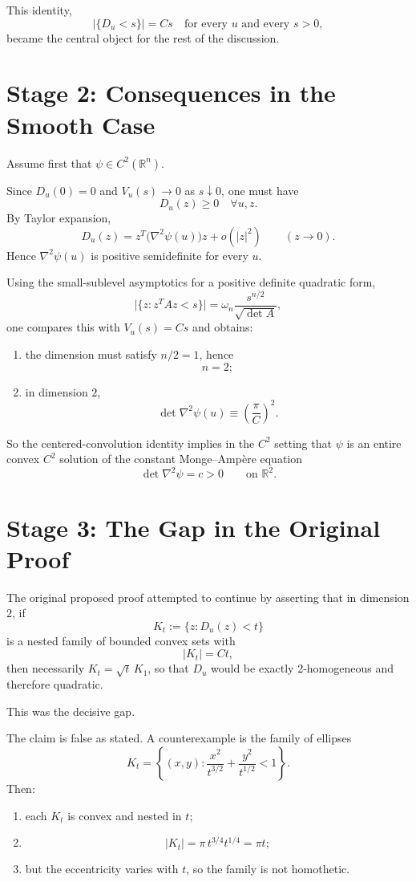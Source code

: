 \documentclass[11pt]{article}
\begin{document}
This identity,
\[
\bigl|\{D_u<s\}\bigr|=Cs
\quad\text{for every }u\text{ and every }s>0,
\]
became the central object for the rest of the discussion.

\section*{Stage 2: Consequences in the Smooth Case}

Assume first that $\psi\in C^2(\mathbb{R}^n)$.

Since $D_u(0)=0$ and $V_u(s)\to 0$ as $s\downarrow 0$, one must have
\[
D_u(z)\geq 0
\quad\forall u,z.
\]
By Taylor expansion,
\[
D_u(z)=z^T\bigl(\nabla^2\psi(u)\bigr)z+o(|z|^2)
\qquad(z\to 0).
\]
Hence $\nabla^2\psi(u)$ is positive semidefinite for every $u$.

Using the small-sublevel asymptotics for a positive definite quadratic form,
\[
\bigl|\{z:z^TAz<s\}\bigr|
=\omega_n\frac{s^{n/2}}{\sqrt{\det A}},
\]
one compares this with $V_u(s)=Cs$ and obtains:
\begin{enumerate}[label=\arabic*.]
\item the dimension must satisfy $n/2=1$, hence
\[
n=2;
\]
\item in dimension $2$,
\[
\det \nabla^2\psi(u)\equiv \left(\frac{\pi}{C}\right)^2.
\]
\end{enumerate}

So the centered-convolution identity implies in the $C^2$ setting that $\psi$ is an entire convex $C^2$ solution of the constant Monge--Amp\`ere equation
\[
\det \nabla^2\psi = c>0
\qquad\text{on }\mathbb{R}^2.
\]

\section*{Stage 3: The Gap in the Original Proof}

The original proposed proof attempted to continue by asserting that in dimension $2$, if
\[
K_t:=\{z:D_u(z)<t\}
\]
is a nested family of bounded convex sets with
\[
|K_t|=Ct,
\]
then necessarily $K_t=\sqrt{t}\,K_1$, so that $D_u$ would be exactly 2-homogeneous and therefore quadratic.

This was the decisive gap.

The claim is false as stated. A counterexample is the family of ellipses
\[
K_t=\left\{(x,y):\frac{x^2}{t^{3/2}}+\frac{y^2}{t^{1/2}}<1\right\}.
\]
Then:
\begin{enumerate}[label=\arabic*.]
\item each $K_t$ is convex and nested in $t$;
\item
\[
|K_t|=\pi\, t^{3/4}t^{1/4}=\pi t;
\]
\item but the eccentricity varies with $t$, so the family is not homothetic.
\end{enumerate}
\end{document}

